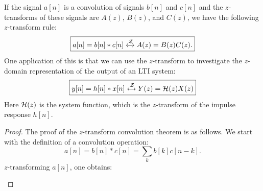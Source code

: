 If the signal $a[n]$ is a convolution of signals $b[n]$ and $c[n]$ and the
$z$-transforms of these signals are $A(z)$, $B(z)$, and $C(z)$, we
have the following $z$-transform rule:
\begin{equation}
  \boxed{
    a[n]=b[n]*c[n] \xleftrightarrow{\mathcal{Z}} A(z) = B(z) C(z).
  }
\end{equation}
One application of this is that we can use the $z$-transform to investigate the $z$-domain representation of the output of an LTI system:
\begin{equation}
  \boxed{
    y[n]=h[n]*x[n] \xleftrightarrow{\mathcal{Z}} Y(z) = \mathcal{H}(z) X(z)
    }
\end{equation}
Here $\mathcal{H}(z)$ is the system function, which is the $z$-transform of the impulse response $h[n]$.

\begin{proof}
The proof of the $z$-transform convolution theorem is as follows. We start with the definition of a convolution operation:
\begin{equation}
a[n] = b[n]*c[n] = \sum_{k} b[k] c[n-k].
\end{equation}
$z$-transforming $a[n]$, one obtains:
\begin{marginfigure}
\begin{center}
\end{center}
\end{marginfigure}
\end{proof}
